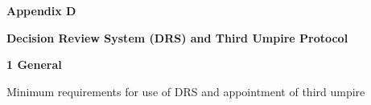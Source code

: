 \documentclass[12pt]{article}
\begin{document}
\vspace{\baselineskip}

\vspace{\baselineskip}

\vspace{\baselineskip}

\vspace{\baselineskip}

\vspace{\baselineskip}

\vspace{\baselineskip}

\vspace{\baselineskip}

\vspace{\baselineskip}

\vspace{\baselineskip}
\begin{Center}
{\fontsize{8pt}{9.6pt}\par}
\end{Center}\par


\vspace{\baselineskip}
\begin{adjustwidth}{0.0in}{0.08in}
\begin{Center}
{\fontsize{11pt}{13.2pt}\selectfont \textbf{Appendix D}\par}
\end{Center}\par

\end{adjustwidth}


\vspace{\baselineskip}
\begin{adjustwidth}{1.04in}{0.0in}
{\fontsize{11pt}{13.2pt}\selectfont \textbf{Decision Review System (DRS) and Third Umpire Protocol}\par}\par

\end{adjustwidth}


\vspace{\baselineskip}
{\fontsize{16pt}{19.2pt}\selectfont \textbf{1 \tabto{0.47in} General}\par}\par


\vspace{\baselineskip}
{\fontsize{9pt}{10.8pt} \tabto{0.39in} {\fontsize{8pt}{9.6pt}\selectfont Minimum requirements for use of DRS and appointment of third umpire\par}\par}\par
\end{document}
